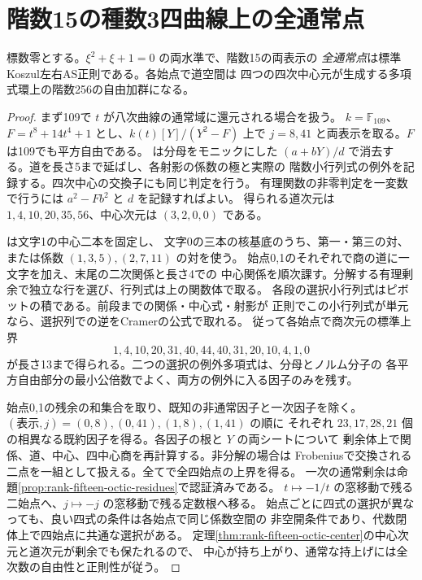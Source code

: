 \section{階数15の種数3四曲線上の全通常点}
\label{sec:rank-fifteen-octic-all}
\begin{theorem}\label{thm:rank-fifteen-octic-all}
標数零とする。$\xi^2+\xi+1=0$ の両水準で、階数15の両表示の
\emph{全通常点}は標準Koszul左右AS正則である。各始点で道空間は
四つの四次中心元が生成する多項式環上の階数256の自由加群になる。
\end{theorem}
\begin{proof}
まず109で $t$ が八次曲線の通常域に還元される場合を扱う。
$k=\mathbb F_{109}$、$F=t^8+14t^4+1$ とし、$k(t)[Y]/(Y^2-F)$ 上で
$j=8,41$ と両表示を取る。$F$ は109でも平方自由である。
 は分母をモニックにした
$(a+bY)/d$ で消去する。道を長さ5まで延ばし、各射影の係数の極と実際の
階数小行列式の例外を記録する。四次中心の交換子にも同じ判定を行う。
有理関数の非零判定を一変数で行うには $a^2-Fb^2$ と $d$ を記録すればよい。
得られる道次元は $1,4,10,20,35,56$、中心次元は $(3,2,0,0)$ である。

 は文字1の中心二本を固定し、
文字0の三本の核基底のうち、第一・第三の対、または係数 $(1,3,5),(2,7,11)$ の対を使う。
始点0,1のそれぞれで商の道に一文字を加え、末尾の二次関係と長さ4での
中心関係を順次課す。分解する有理剰余で独立な行を選び、行列式は上の関数体で取る。
各段の選択小行列式はピボットの積である。前段までの関係・中心式・射影が
正則でこの小行列式が単元なら、選択列での逆をCramerの公式で取れる。
従って各始点で商次元の標準上界
\[
 1,4,10,20,31,40,44,40,31,20,10,4,1,0
\]
が長さ13まで得られる。二つの選択の例外多項式は、分母とノルム分子の
各平方自由部分の最小公倍数でよく、両方の例外に入る因子のみを残す。

始点0,1の残余の和集合を取り、既知の非通常因子と一次因子を除く。
$(\text{表示},j)=(0,8),(0,41),(1,8),(1,41)$ の順に
それぞれ $23,17,28,21$ 個の相異なる既約因子を得る。各因子の根と $Y$ の両シートについて
剰余体上で関係、道、中心、四中心商を再計算する。非分解の場合は
Frobeniusで交換される二点を一組として扱える。全てで全四始点の上界を得る。
一次の通常剰余は命題\ref{prop:rank-fifteen-octic-residues}で認証済みである。
$t\mapsto-1/t$ の窓移動で残る二始点へ、$j\mapsto-j$ の窓移動で残る定数根へ移る。
始点ごとに四式の選択が異なっても、良い四式の条件は各始点で同じ係数空間の
非空開条件であり、代数閉体上で四始点に共通な選択がある。
定理\ref{thm:rank-fifteen-octic-center}の中心次元と道次元が剰余でも保たれるので、
中心が持ち上がり、通常な持上げには全次数の自由性と正則性が従う。


\end{proof}
